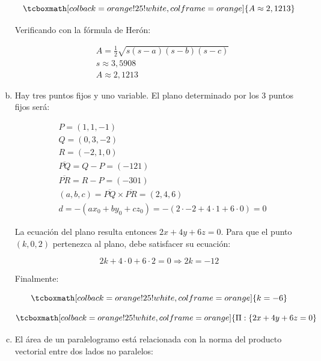 \documentclass{article}
\begin{document}
\begin{enumerate}[(a)]
\begin{equation}
\tcboxmath[colback=orange!25!white,colframe=orange]
{ A \approx 2,1213 }
\end{equation}

Verificando con la fórmula de Herón:

\begin{subequations}
\begin{align}
& A = \frac{1}{2} \sqrt{s (s-a) (s-b) (s-c)} \\
& s \approx 3,5908 \\
& A \approx 2,1213
\end{align}
\end{subequations}

\item Hay tres puntos fijos y uno variable. El plano determinado por los 3 puntos fijos será:

\begin{subequations}
\begin{align}
& P = (1, 1, -1) \\
& Q = (0, 3, -2) \\
& R = (-2, 1, 0) \\
& \overline{PQ} = Q-P = (-1 2 1) \\
& \overline{PR} = R-P = (-3 0 1) \\
& (a,b,c) = \overline{PQ} \times \overline{PR} = (2, 4, 6) \\
& d = -(a x_0 + b y_0 + c z_0) = -(2 \cdot -2 + 4 \cdot 1 + 6 \cdot 0) = 0
\end{align}
\end{subequations}

La ecuación del plano resulta entonces $2x + 4y + 6z = 0$. Para que el punto $(k, 0, 2)$ pertenezca al plano, debe satisfacer su ecuación:

\begin{equation}
2k + 4 \cdot 0 + 6 \cdot 2 = 0 \Rightarrow 2k = -12
\end{equation}

Finalmente:

\begin{equation}
\tcboxmath[colback=orange!25!white,colframe=orange]
{ k = -6 }
\end{equation}

\begin{equation}
\tcboxmath[colback=orange!25!white,colframe=orange]
{ \Pi: \{ 2x + 4y + 6z = 0 }
\end{equation}

\item El área de un paralelogramo está relacionada con la norma del producto vectorial entre dos lados no paralelos:


\end{enumerate}
\end{document}
